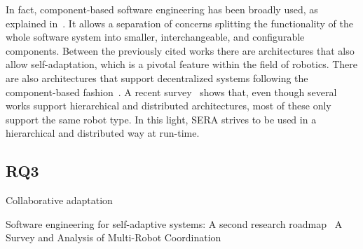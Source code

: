 In fact, component-based software engineering has been broadly used, as explained in~\cite{Brugali2009}. 
It allows a separation of concerns splitting the functionality of the whole software system into smaller, interchangeable, and configurable components. 
Between the previously cited works there are architectures that also allow self-adaptation, which is a pivotal feature within the field of robotics.
There are also architectures that support decentralized systems following the component-based fashion~\cite{Lesire2016}.
A recent survey~\cite{Zhi} shows that, even though several works support hierarchical and distributed architectures, most of these only support the same robot type. 
In this light, SERA strives to be used in a hierarchical and distributed way at run-time.

\subsection{RQ3}

Collaborative adaptation

Software engineering for self-adaptive systems: A second research roadmap~\cite{DeLemos2013}
A Survey and Analysis of Multi-Robot Coordination~\cite{Yan2013} 
 ~\cite{DeAngelis2015,DeAngelis2016}

